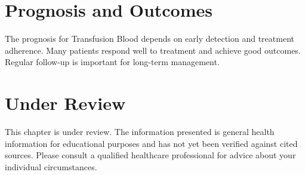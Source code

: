\section*{Prognosis and Outcomes}
The prognosis for Transfusion Blood depends on early detection and treatment adherence. Many patients respond well to treatment and achieve good outcomes. Regular follow-up is important for long-term management.
\section*{Under Review}
This chapter is under review. The information presented is general health information for educational purposes and has not yet been verified against cited sources. Please consult a qualified healthcare professional for advice about your individual circumstances.


\clearpage
